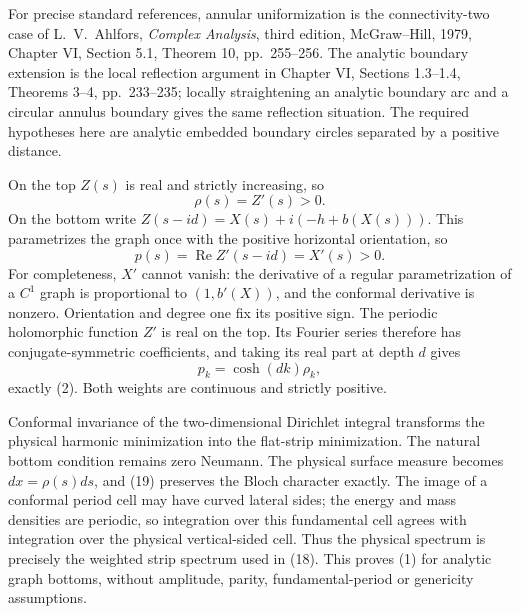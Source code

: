 \documentclass[11pt]{article}
\begin{document}
For precise standard references, annular uniformization is the
connectivity-two case of L.~V.~Ahlfors, \emph{Complex Analysis},
third edition, McGraw--Hill, 1979, Chapter VI, Section 5.1,
Theorem 10, pp.~255--256. The analytic boundary extension is the
local reflection argument in Chapter VI, Sections 1.3--1.4,
Theorems 3--4, pp.~233--235; locally straightening an analytic
boundary arc and a circular annulus boundary gives the same
reflection situation. The required hypotheses here are analytic
embedded boundary circles separated by a positive distance.

On the top $Z(s)$ is real and strictly increasing, so
\[
 \rho(s)=Z'(s)>0.
\]
On the bottom write $Z(s-id)=X(s)+i(-h+b(X(s)))$. This parametrizes
the graph once with the positive horizontal orientation, so
\[
 p(s)=\operatorname{Re}Z'(s-id)=X'(s)>0. \tag{20}
\]
For completeness, $X'$ cannot vanish: the derivative of a regular
parametrization of a $C^1$ graph is proportional to
$(1,b'(X))$, and the conformal derivative is nonzero. Orientation
and degree one fix its positive sign.
The periodic holomorphic function $Z'$ is real on the top. Its
Fourier series therefore has conjugate-symmetric coefficients,
and taking its real part at depth $d$ gives
\[
 p_k=\cosh(dk)\rho_k, \tag{21}
\]
exactly (2). Both weights are continuous and strictly positive.

Conformal invariance of the two-dimensional Dirichlet integral
transforms the physical harmonic minimization into the flat-strip
minimization. The natural bottom condition remains zero Neumann.
The physical surface measure becomes $dx=\rho(s)ds$, and (19)
preserves the Bloch character exactly. The image of a conformal
period cell may have curved lateral sides; the energy and mass
densities are periodic, so integration over this fundamental cell
agrees with integration over the physical vertical-sided cell.
Thus the physical spectrum
is precisely the weighted strip spectrum used in (18). This proves
(1) for analytic graph bottoms, without amplitude, parity,
fundamental-period or genericity assumptions.
\end{document}
